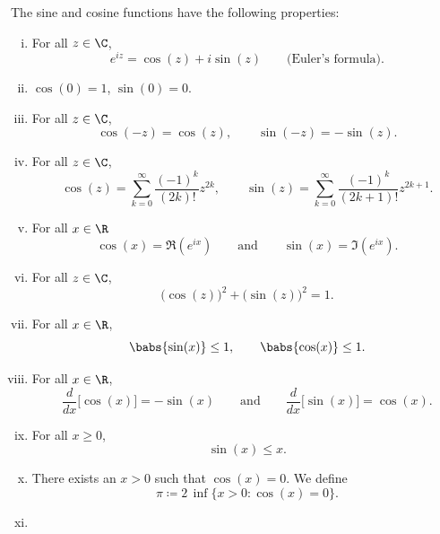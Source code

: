 \begin{prop}
The sine and cosine functions have the following properties:
\begin{enumerate}[(i)]
\item For all $z \in \C$,
\begin{equation*}
e^{iz} = \cos(z) + i\sin(z) \qquad
\text{(Euler's formula)}.
\end{equation*}
\item $\cos(0) = 1$, $\sin(0) = 0$.
\item For all $z \in \C$,
\begin{equation*}
\cos(-z) = \cos(z), \qquad
\sin(-z) = -\sin(z).
\end{equation*}
\item For all $z \in \C$,
\begin{equation*}
\cos(z) = \sum_{k=0}^\infty \frac{{(-1)}^k}{(2k)!} z^{2k} ,
\qquad
\sin(z) = \sum_{k=0}^\infty \frac{{(-1)}^k}{(2k+1)!} z^{2k+1} .
\end{equation*}
\item For all $x \in \R$
\begin{equation*}
\cos(x) = \Re (e^{ix})
\qquad\text{and}\qquad
\sin(x) = \Im (e^{ix}) .
\end{equation*}
\item For all $z \in \C$,
\begin{equation*}
{\bigl( \cos(z) \bigr)}^2 + {\bigl( \sin(z) \bigr)}^2 = 1 .
\end{equation*}
\item For all $x \in \R$,
\begin{equation*}
\babs{\sin(x)} \leq 1, \qquad \babs{\cos(x)} \leq 1 .
\end{equation*}
\item For all $x \in \R$,
\begin{equation*}
\frac{d}{dx} \bigl[ \cos(x) \bigr] = -\sin(x)
\qquad \text{and} \qquad
\frac{d}{dx} \bigl[ \sin(x) \bigr] = \cos(x) .
\end{equation*}
\item For all $x \geq 0$,
\begin{equation*}
\sin(x) \leq x .
\end{equation*}
\item
There exists an $x > 0$ such that $\cos(x) = 0$.  We define
\begin{equation*}
\pi \coloneqq 2 \, \inf \{ x > 0 : \cos(x) = 0 \} .
\end{equation*}
\item

\end{enumerate}
\end{prop}
